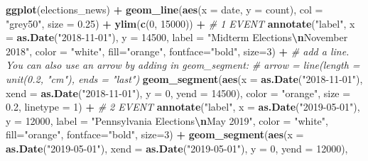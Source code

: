 \documentclass[
]{article}
\newenvironment{Shaded}{\begin{snugshade}}{\end{snugshade}}
\newcommand{\AttributeTok}[1]{\textcolor[rgb]{0.13,0.29,0.53}{#1}}
\newcommand{\CommentTok}[1]{\textcolor[rgb]{0.56,0.35,0.01}{\textit{#1}}}
\newcommand{\DecValTok}[1]{\textcolor[rgb]{0.00,0.00,0.81}{#1}}
\newcommand{\FloatTok}[1]{\textcolor[rgb]{0.00,0.00,0.81}{#1}}
\newcommand{\FunctionTok}[1]{\textcolor[rgb]{0.13,0.29,0.53}{\textbf{#1}}}
\newcommand{\NormalTok}[1]{#1}
\newcommand{\SpecialCharTok}[1]{\textcolor[rgb]{0.81,0.36,0.00}{\textbf{#1}}}
\newcommand{\StringTok}[1]{\textcolor[rgb]{0.31,0.60,0.02}{#1}}
\begin{document}
\begin{Shaded}
\begin{Highlighting}[]
\FunctionTok{ggplot}\NormalTok{(elections\_news) }\SpecialCharTok{+}
  \FunctionTok{geom\_line}\NormalTok{(}\FunctionTok{aes}\NormalTok{(}\AttributeTok{x =}\NormalTok{ date, }\AttributeTok{y =}\NormalTok{ count), }\AttributeTok{col =} \StringTok{"grey50"}\NormalTok{, }\AttributeTok{size =} \FloatTok{0.25}\NormalTok{) }\SpecialCharTok{+}
  \FunctionTok{ylim}\NormalTok{(}\FunctionTok{c}\NormalTok{(}\DecValTok{0}\NormalTok{, }\DecValTok{15000}\NormalTok{)) }\SpecialCharTok{+}
  \CommentTok{\# 1 EVENT}
  \FunctionTok{annotate}\NormalTok{(}\StringTok{"label"}\NormalTok{, }\AttributeTok{x =} \FunctionTok{as.Date}\NormalTok{(}\StringTok{"2018{-}11{-}01"}\NormalTok{), }\AttributeTok{y =} \DecValTok{14500}\NormalTok{, }
           \AttributeTok{label =} \StringTok{"Midterm Elections}\SpecialCharTok{\textbackslash{}n}\StringTok{November 2018"}\NormalTok{, }\AttributeTok{color =} \StringTok{"white"}\NormalTok{, }\AttributeTok{fill=}\StringTok{"orange"}\NormalTok{, }\AttributeTok{fontface=}\StringTok{"bold"}\NormalTok{, }\AttributeTok{size=}\DecValTok{3}\NormalTok{) }\SpecialCharTok{+}
  \CommentTok{\# add a line. You can also use an arrow by adding in geom\_segment: }
  \CommentTok{\# arrow = line(length = unit(0.2, "cm"), ends = "last") }
  \FunctionTok{geom\_segment}\NormalTok{(}\FunctionTok{aes}\NormalTok{(}\AttributeTok{x =} \FunctionTok{as.Date}\NormalTok{(}\StringTok{"2018{-}11{-}01"}\NormalTok{), }\AttributeTok{xend =} \FunctionTok{as.Date}\NormalTok{(}\StringTok{"2018{-}11{-}01"}\NormalTok{), }\AttributeTok{y =} \DecValTok{0}\NormalTok{, }\AttributeTok{yend =} \DecValTok{14500}\NormalTok{), }
               \AttributeTok{color =} \StringTok{"orange"}\NormalTok{, }\AttributeTok{size =} \FloatTok{0.2}\NormalTok{, }\AttributeTok{linetype =} \DecValTok{1}\NormalTok{) }\SpecialCharTok{+}
  \CommentTok{\# 2 EVENT}
  \FunctionTok{annotate}\NormalTok{(}\StringTok{"label"}\NormalTok{, }\AttributeTok{x =} \FunctionTok{as.Date}\NormalTok{(}\StringTok{"2019{-}05{-}01"}\NormalTok{), }\AttributeTok{y =} \DecValTok{12000}\NormalTok{, }
           \AttributeTok{label =} \StringTok{"Pennsylvania Elections}\SpecialCharTok{\textbackslash{}n}\StringTok{May 2019"}\NormalTok{, }\AttributeTok{color =} \StringTok{"white"}\NormalTok{, }\AttributeTok{fill=}\StringTok{"orange"}\NormalTok{, }\AttributeTok{fontface=}\StringTok{"bold"}\NormalTok{, }\AttributeTok{size=}\DecValTok{3}\NormalTok{) }\SpecialCharTok{+}
  \FunctionTok{geom\_segment}\NormalTok{(}\FunctionTok{aes}\NormalTok{(}\AttributeTok{x =} \FunctionTok{as.Date}\NormalTok{(}\StringTok{"2019{-}05{-}01"}\NormalTok{), }\AttributeTok{xend =} \FunctionTok{as.Date}\NormalTok{(}\StringTok{"2019{-}05{-}01"}\NormalTok{), }\AttributeTok{y =} \DecValTok{0}\NormalTok{, }\AttributeTok{yend =} \DecValTok{12000}\NormalTok{), }

\end{Highlighting}
\end{Shaded}
\end{document}
